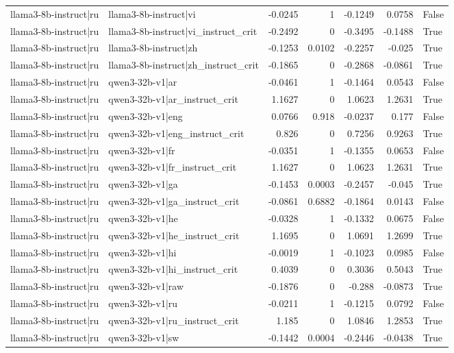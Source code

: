 \begin{table}
\begin{tabular}{l l r r r r l}
llama3-8b-instruct|ru & llama3-8b-instruct|vi & -0.0245 & 1 & -0.1249 & 0.0758 & False \\
llama3-8b-instruct|ru & llama3-8b-instruct|vi_instruct_crit & -0.2492 & 0 & -0.3495 & -0.1488 & True \\
llama3-8b-instruct|ru & llama3-8b-instruct|zh & -0.1253 & 0.0102 & -0.2257 & -0.025 & True \\
llama3-8b-instruct|ru & llama3-8b-instruct|zh_instruct_crit & -0.1865 & 0 & -0.2868 & -0.0861 & True \\
llama3-8b-instruct|ru & qwen3-32b-v1|ar & -0.0461 & 1 & -0.1464 & 0.0543 & False \\
llama3-8b-instruct|ru & qwen3-32b-v1|ar_instruct_crit & 1.1627 & 0 & 1.0623 & 1.2631 & True \\
llama3-8b-instruct|ru & qwen3-32b-v1|eng & 0.0766 & 0.918 & -0.0237 & 0.177 & False \\
llama3-8b-instruct|ru & qwen3-32b-v1|eng_instruct_crit & 0.826 & 0 & 0.7256 & 0.9263 & True \\
llama3-8b-instruct|ru & qwen3-32b-v1|fr & -0.0351 & 1 & -0.1355 & 0.0653 & False \\
llama3-8b-instruct|ru & qwen3-32b-v1|fr_instruct_crit & 1.1627 & 0 & 1.0623 & 1.2631 & True \\
llama3-8b-instruct|ru & qwen3-32b-v1|ga & -0.1453 & 0.0003 & -0.2457 & -0.045 & True \\
llama3-8b-instruct|ru & qwen3-32b-v1|ga_instruct_crit & -0.0861 & 0.6882 & -0.1864 & 0.0143 & False \\
llama3-8b-instruct|ru & qwen3-32b-v1|he & -0.0328 & 1 & -0.1332 & 0.0675 & False \\
llama3-8b-instruct|ru & qwen3-32b-v1|he_instruct_crit & 1.1695 & 0 & 1.0691 & 1.2699 & True \\
llama3-8b-instruct|ru & qwen3-32b-v1|hi & -0.0019 & 1 & -0.1023 & 0.0985 & False \\
llama3-8b-instruct|ru & qwen3-32b-v1|hi_instruct_crit & 0.4039 & 0 & 0.3036 & 0.5043 & True \\
llama3-8b-instruct|ru & qwen3-32b-v1|raw & -0.1876 & 0 & -0.288 & -0.0873 & True \\
llama3-8b-instruct|ru & qwen3-32b-v1|ru & -0.0211 & 1 & -0.1215 & 0.0792 & False \\
llama3-8b-instruct|ru & qwen3-32b-v1|ru_instruct_crit & 1.185 & 0 & 1.0846 & 1.2853 & True \\
llama3-8b-instruct|ru & qwen3-32b-v1|sw & -0.1442 & 0.0004 & -0.2446 & -0.0438 & True \\

\end{tabular}
\end{table}
